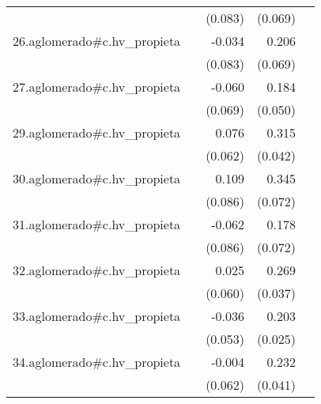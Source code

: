 {\begin{longtable}{l*{4}{D{.}{.}{-1}}}
            &                     &     (0.083)         &     (0.069)         &                     \\
\addlinespace
26.aglomerado#c.hv\_propieta&                     &      -0.034         &       0.206\sym{**} &                     \\
            &                     &     (0.083)         &     (0.069)         &                     \\
\addlinespace
27.aglomerado#c.hv\_propieta&                     &      -0.060         &       0.184\sym{***}&                     \\
            &                     &     (0.069)         &     (0.050)         &                     \\
\addlinespace
29.aglomerado#c.hv\_propieta&                     &       0.076         &       0.315\sym{***}&                     \\
            &                     &     (0.062)         &     (0.042)         &                     \\
\addlinespace
30.aglomerado#c.hv\_propieta&                     &       0.109         &       0.345\sym{***}&                     \\
            &                     &     (0.086)         &     (0.072)         &                     \\
\addlinespace
31.aglomerado#c.hv\_propieta&                     &      -0.062         &       0.178\sym{*}  &                     \\
            &                     &     (0.086)         &     (0.072)         &                     \\
\addlinespace
32.aglomerado#c.hv\_propieta&                     &       0.025         &       0.269\sym{***}&                     \\
            &                     &     (0.060)         &     (0.037)         &                     \\
\addlinespace
33.aglomerado#c.hv\_propieta&                     &      -0.036         &       0.203\sym{***}&                     \\
            &                     &     (0.053)         &     (0.025)         &                     \\
\addlinespace
34.aglomerado#c.hv\_propieta&                     &      -0.004         &       0.232\sym{***}&                     \\
            &                     &     (0.062)         &     (0.041)         &                     \\

\end{longtable}}
